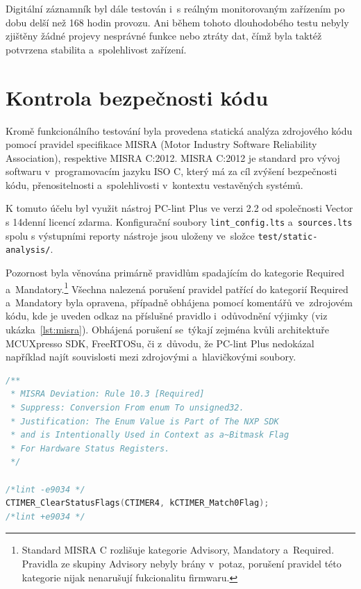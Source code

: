 Digitální záznamník byl dále testován i~s reálným monitorovaným zařízením po dobu delší než 168 hodin provozu. Ani během tohoto dlouhodobého testu nebyly zjištěny žádné projevy nesprávné funkce nebo ztráty dat, čímž byla taktéž potvrzena stabilita a~spolehlivost zařízení.

\section{Kontrola bezpečnosti kódu}
Kromě funkcionálního testování byla provedena statická analýza zdrojového kódu pomocí pravidel specifikace MISRA (Motor Industry Software Reliability Association), respektive MISRA C:2012. MISRA C:2012 je standard pro vývoj softwaru v~programovacím jazyku ISO C, který má za cíl zvýšení bezpečnosti kódu, přenositelnosti a~spolehlivosti v~kontextu vestavěných systémů.

K tomuto účelu byl využit nástroj PC-lint Plus ve verzi 2.2 od společnosti Vector s 14denní licencí zdarma. Konfigurační soubory \texttt{lint\_config.lts} a~\texttt{sources.lts} spolu s výstupními reporty nástroje jsou uloženy ve~složce \texttt{test/static-analysis/}.

Pozornost byla věnována primárně pravidlům spadajícím do kategorie Required a~Mandatory.\footnote{Standard MISRA C rozlišuje kategorie Advisory, Mandatory a~Required. Pravidla ze skupiny Advisory nebyly brány v~potaz, porušení pravidel této kategorie nijak nenarušují fukcionalitu firmwaru.} Všechna nalezená porušení pravidel patřící do kategorií Required a~Mandatory byla opravena, případně obhájena pomocí komentářů ve~zdrojovém kódu, kde je uveden odkaz na příslušné pravidlo i~odůvodnění výjimky (viz ukázka~\ref{lst:misra}). Obhájená porušení se~týkají zejména kvůli architektuře MCUXpresso SDK, FreeRTOSu, či z~důvodu, že PC-lint Plus nedokázal například najít souvislosti mezi zdrojovými a~hlavičkovými soubory.

\newpage

\begin{lstlisting}[language=C, caption={Ukázka odůvodněného porušení pravidla MISRA}, label={lst:misra}]
/**
 * MISRA Deviation: Rule 10.3 [Required]
 * Suppress: Conversion From enum To unsigned32.
 * Justification: The Enum Value is Part of The NXP SDK
 * and is Intentionally Used in Context as a~Bitmask Flag 
 * For Hardware Status Registers.
 */

/*lint -e9034 */
CTIMER_ClearStatusFlags(CTIMER4, kCTIMER_Match0Flag);
/*lint +e9034 */
\end{lstlisting}

